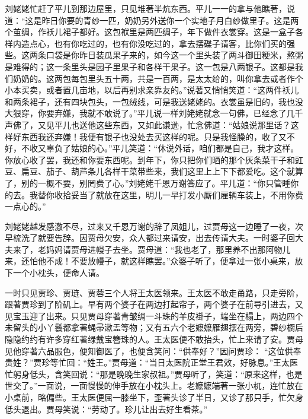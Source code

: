 \begin{parag}


    刘姥姥忙赶了平儿到那边屋里，只见堆著半炕东西。平儿一一的拿与他瞧著，说道：“这是昨日你要的青纱一匹，奶奶另外送你一个实地子月白纱做里子。这是两个茧绸，作袄儿裙子都好。这包袱里是两匹绸子，年下做件衣裳穿。这是一盒子各样内造点心，也有你吃过的，也有你没吃过的，拿去摆碟子请客，比你们买的强些。这两条口袋是你昨日装瓜果子来的，如今这一个里头装了两斗御田粳米，熬粥是难得的；这一条里头是园子里果子和各样干果子。这一包是八两银子。这都是我们奶奶的。这两包每包里头五十两，共是一百两，是太太给的，叫你拿去或者作个小本买卖，或者置几亩地，以后再别求亲靠友的。”说著又悄悄笑道：“这两件袄儿和两条裙子，还有四块包头，一包绒线，可是我送姥姥的。衣裳虽是旧的，我也没大狠穿，你要弃嫌，我就不敢说了。”平儿说一样刘姥姥就念一句佛，已经念了几千声佛了，又见平儿也送他这些东西，又如此谦逊，忙念佛道：“姑娘说那里话？这样好东西我还弃嫌！我便有银子也没处去买这样的呢。只是我怪臊的，收了又不好，不收又辜负了姑娘的心。”平儿笑道：“休说外话，咱们都是自己，我才这样。你放心收了罢，我还和你要东西呢。到年下，你只把你们晒的那个灰条菜干子和豇豆、扁豆、茄子、葫芦条儿各样干菜带些来，我们这里上上下下都爱吃。这个就算了，别的一概不要，别罔费了心。”刘姥姥千恩万谢答应了。平儿道：“你只管睡你的去。我替你收拾妥当了就放在这里，明儿一早打发小厮们雇辆车装上，不用你费一点心的。”
\end{parag}


\begin{parag}


    刘姥姥越发感激不尽，过来又千恩万谢的辞了凤姐儿，过贾母这一边睡了一夜，次早梳洗了就要告辞。因贾母欠安，众人都过来请安，出去传请大夫。一时婆子回大夫来了，老妈妈请贾母进幔子去坐。贾母道：“我也老了，那里养不出那阿物儿来，还怕他不成！不要放幔子，就这样瞧罢。”众婆子听了，便拿过一张小桌来，放下一个小枕头，便命人请。
\end{parag}


\begin{parag}


    一时只见贾珍、贾琏、贾蓉三个人将王太医领来。王太医不敢走甬路，只走旁阶，跟著贾珍到了阶矶上。早有两个婆子在两边打起帘子，两个婆子在前导引进去，又见宝玉迎了出来。只见贾母穿著青皱绸一斗珠的羊皮褂子，端坐在榻上，两边四个未留头的小丫鬟都拿著蝇帚漱盂等物；又有五六个老嬷嬷雁翅摆在两旁，碧纱橱后隐隐约约有许多穿红著绿戴宝簪珠的人。王太医便不敢抬头，忙上来请了安。贾母见他穿著六品服色，便知御医了，也便含笑问：“供奉好？”因问贾珍： “这位供奉贵姓？”贾珍等忙回：“姓王。”贾母道：“当日太医院正堂王君效，好脉息。”王太医忙躬身低头，含笑回说：“那是晚晚生家叔祖。”贾母听了，笑道：“原来这样，也是世交了。”一面说，一面慢慢的伸手放在小枕头上。老嬷嬷端著一张小杌，连忙放在小桌前，略偏些。王太医便屈一膝坐下，歪著头诊了半日，又诊了那只手，忙欠身低头退出。贾母笑说：“劳动了。珍儿让出去好生看茶。”
\end{parag}


